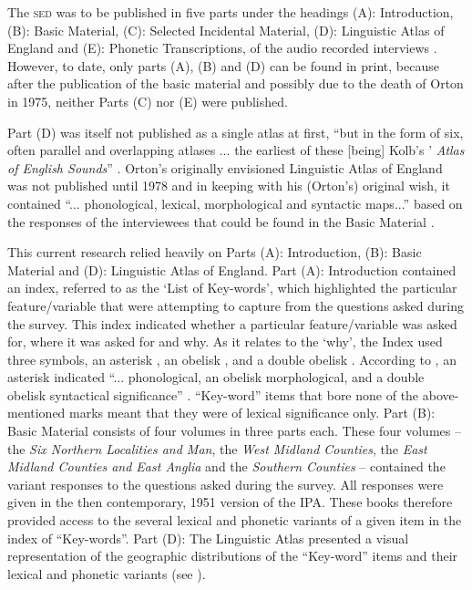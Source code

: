 The \textsc{sed} was to be published in five parts under the headings (A): Introduction, (B): Basic Material, (C): Selected Incidental Material, (D): Linguistic Atlas of England and (E): Phonetic Transcriptions, of the audio recorded interviews \citep{Orton62}. However, to date, only parts (A), (B) and (D) can be found in print, because after the publication of the basic material and possibly due to the death of Orton in 1975, neither Parts (C) nor (E) were published.

Part (D) was itself not published as a single atlas at first, ``but in the form of six, often parallel and overlapping atlases ... the earliest of these [being] Kolb's \citep{Kolb79}'  \emph{Atlas of English Sounds}'' \citep[12]{Fischer91}. Orton's originally envisioned Linguistic Atlas of England was not published until 1978 and in keeping with his (Orton's) original wish, it contained ``... phonological, lexical, morphological and syntactic maps...'' based on the responses of the interviewees that could be found in the Basic Material \citep[12]{Fischer91}.

This current research relied heavily on Parts (A): Introduction, (B): Basic Material and (D): Linguistic Atlas of England. Part (A): Introduction contained an index, referred to as the `List of Key-words', which highlighted the particular feature/variable that \citet{Orton62} were attempting to capture from the questions asked during the survey. This index indicated whether a particular feature/variable was asked for, where it was asked for and why. As it relates to the `why', the Index used three symbols, an asterisk \textasteriskcentered, an obelisk \textdagger, and a double obelisk \textdaggerdbl. According to \citet{Orton62}, an asterisk indicated ``... phonological, an obelisk morphological, and a double obelisk syntactical significance'' \cite[47]{Orton62}. ``Key-word'' items that bore none of the above-mentioned marks meant that they were of lexical significance only. Part (B): Basic Material consists of four volumes in three parts each. These four volumes -- the \emph{Six Northern Localities and Man}, the \emph{West Midland Counties}, the \emph{East Midland Counties and East Anglia} and the \emph{Southern Counties} -- contained the variant responses to the questions asked during the survey. All responses were given in the then contemporary, 1951 version of the IPA. These books therefore provided access to the several lexical and phonetic variants of a given item in the index of ``Key-words''. Part (D): The Linguistic Atlas presented a visual representation of the geographic distributions of the ``Key-word'' items and their lexical and phonetic variants (see ).

